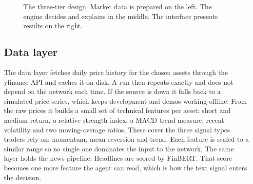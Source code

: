 \documentclass[12pt,twoside,letterpaper]{article}
\begin{document}
\begin{figure}[H]
\centering
{}
\caption{The three-tier design. Market data is prepared on the left. The engine
decides and explains in the middle. The interface presents results on the right.}
\label{fig:arch}
\end{figure}

\subsection{Data layer}

The data layer fetches daily price history for the chosen assets through the
yfinance API and caches it on disk. A run then repeats exactly and does not depend
on the network each time. If the source is down it falls back to a simulated price
series, which keeps development and demos working offline. From the raw prices it
builds a small set of technical features per asset: short and medium return, a
relative strength index, a MACD trend measure, recent volatility and two
moving-average ratios. These cover the three signal types traders rely on: momentum,
mean reversion and trend. Each feature is scaled to a similar range so no single one
dominates the input to the network. The same layer holds the news pipeline.
Headlines are scored by FinBERT. That score becomes one more feature the agent can
read, which is how the text signal enters the decision.
\end{document}

